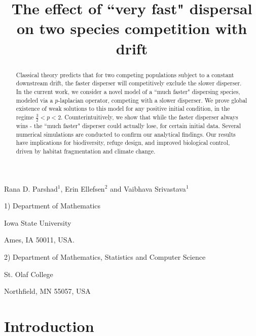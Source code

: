 \documentclass[10pt]{amsart}
\title[PDE FTE competition ] 
    {The effect of ``very fast" dispersal on two species competition with drift}
\theoremstyle{plain}
\theoremstyle{definition}
\begin{document}
\maketitle

\centerline{Rana D. Parshad$^{1}$, Erin Ellefsen$^{2}$ and Vaibhava Srivastava$^{1}$  }
\medskip
{\footnotesize


   \medskip
   
    \centerline{1) Department of Mathematics}
 \centerline{Iowa State University}
   \centerline{Ames, IA 50011, USA.}

 \medskip
\centerline{2) Department of Mathematics, Statistics and Computer Science}
 \centerline{St. Olaf College}
   \centerline{Northfield, MN  55057, USA}


 }




\begin{abstract}

Classical theory predicts that for two competing populations subject to a constant downstream drift, the faster disperser will competitively exclude the slower disperser. In the current work, we consider a novel model of a ``much faster" dispersing  species, modeled via a $p$-laplacian operator, competing with a slower disperser. We prove global existence of weak solutions to this model for any positive initial condition, in the regime $\frac{3}{2} < p <2$. Counterintuitively, we  show that while the faster disperser always wins - the ``much faster" disperser could actually lose, for certain initial data. Several numerical simulations are conducted to confirm our analytical findings. Our results have implications for biodiversity, refuge design, and improved biological control, driven by habitat fragmentation and climate change.

%

\end{abstract}


\section{Introduction}
\end{document}
